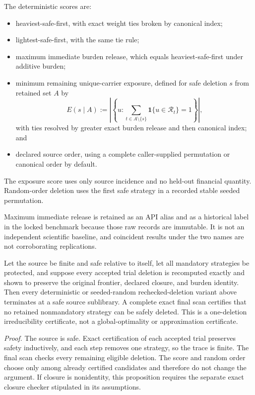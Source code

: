 The deterministic scores are:
\begin{itemize}
 \item heaviest-safe-first, with exact weight ties broken by canonical index;
 \item lightest-safe-first, with the same tie rule;
 \item maximum immediate burden release, which equals heaviest-safe-first
       under additive burden;
 \item minimum remaining unique-carrier exposure, defined for safe deletion
       \(s\) from retained set \(A\) by
       \[
       E(s\mid A):=
       \left|\left\{u:
       \sum_{t\in A\setminus\{s\}}\mathbf1\{u\in\mathcal R_t\}=1
       \right\}\right|,
       \]
       with ties resolved by greater exact burden release and then canonical
       index; and
 \item declared source order, using a complete caller-supplied permutation or
       canonical order by default.
\end{itemize}
The exposure score uses only source incidence and no held-out financial
quantity.  Random-order deletion uses the first safe strategy in a recorded
stable seeded permutation.

Maximum immediate release is retained as an API alias and as a historical label
in the locked benchmark because those raw records are immutable. It is not an
independent scientific baseline, and coincident results under the two names are
not corroborating replications.

\begin{proposition}
\label{prop:aor-certified-deletion-endpoint}
Let the source be finite and safe relative to itself, let all mandatory
strategies be protected, and suppose every accepted trial deletion is
recomputed exactly and shown to preserve the original frontier, declared
closure, and burden identity.  Then every deterministic or seeded-random
rechecked-deletion variant above terminates at a safe source sublibrary.  A
complete exact final scan certifies that no retained nonmandatory strategy can
be safely deleted.  This is a one-deletion irreducibility certificate, not a
global-optimality or approximation certificate.
\end{proposition}

\noindent\emph{Proof.}
The source is safe.  Exact certification of each accepted trial preserves
safety inductively, and each step removes one strategy, so the trace is finite.
The final scan checks every remaining eligible deletion.  The score and random
order choose only among already certified candidates and therefore do not
change the argument.  If closure is nonidentity, this proposition requires the
separate exact closure checker stipulated in its assumptions.

